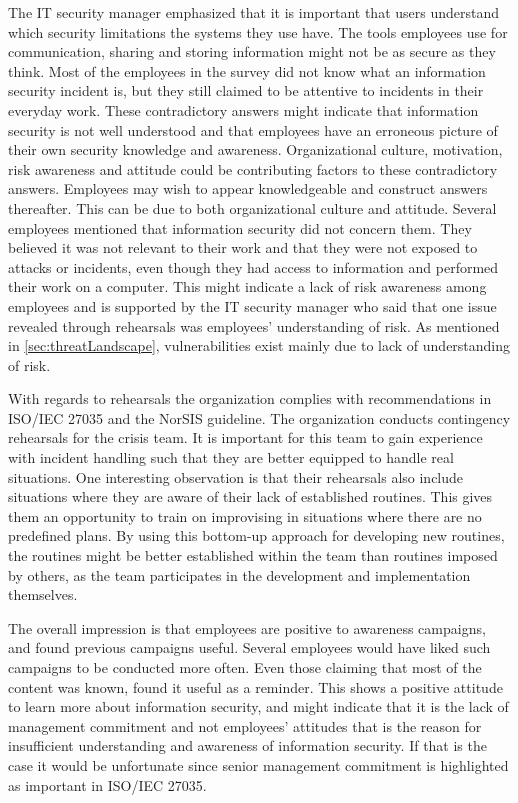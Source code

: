The IT security manager emphasized that it is important that users understand which security limitations the systems they use have. The tools employees use for communication, sharing and storing information might not be as secure as they think. Most of the employees in the survey did not know what an information security incident is, but they still claimed to be attentive to incidents in their everyday work. These contradictory answers might indicate that information security is not well understood and that employees have an erroneous picture of their own security knowledge and awareness. Organizational culture, motivation, risk awareness and attitude could be contributing factors to these contradictory answers. Employees may wish to appear knowledgeable and construct answers thereafter. This can be due to both organizational culture and attitude. Several employees mentioned that information security did not concern them. They believed it was not relevant to their work and that they were not exposed to attacks or incidents, even though they had access to information and performed their work on a computer. This might indicate a lack of risk awareness among employees and is supported by the IT security manager who said that one issue revealed through rehearsals was employees' understanding of risk. As mentioned in \ref{sec:threatLandscape}, vulnerabilities exist mainly due to lack of understanding of risk.

With regards to rehearsals the organization complies with recommendations in ISO/IEC 27035 and the NorSIS guideline. The organization conducts contingency rehearsals for the crisis team. It is important for this team to gain experience with incident handling such that they are better equipped to handle real situations. One interesting observation is that their rehearsals also include situations where they are aware of their lack of established routines. This gives them an opportunity to train on improvising in situations where there are no predefined plans. By using this bottom-up approach for developing new routines, the routines might be better established within the team than routines imposed by others, as the team participates in the development and implementation themselves.

The overall impression is that employees are positive to awareness campaigns, and found previous campaigns useful. Several employees would have liked such campaigns to be conducted more often. Even those claiming that most of the content was known, found it useful as a reminder. This shows a positive attitude to learn more about information security, and might indicate that it is the lack of management commitment and not employees' attitudes that is the reason for insufficient understanding and awareness of information security. If that is the case it would be unfortunate since senior management commitment is highlighted as important in ISO/IEC 27035.

